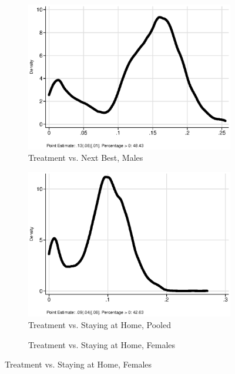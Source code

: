 \begin{figure}
\begin{subfigure}[h]{0.25\textwidth}
		\centering
		\caption{Treatment vs. Next Best, Males}
		\includegraphics[width=\textwidth]{output/irr_2_sexm.eps}
\end{subfigure}
\begin{subfigure}[h]{0.25\textwidth}
	\centering
	\caption{Treatment vs. Staying at Home, Pooled}
		\includegraphics[width=\textwidth]{output/irr_5_sexp.eps}
\end{subfigure}%
\begin{subfigure}[h]{0.25\textwidth}
	\centering
	\caption{Treatment vs. Staying at Home, Females}

\end{subfigure}
\end{figure}
